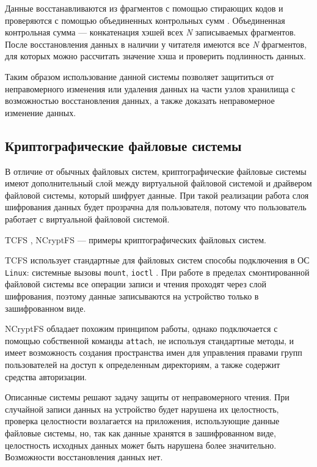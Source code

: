 Данные восстанавливаются из фрагментов с помощью стирающих кодов\cite{erasurecode} и проверяются с помощью объединенных контрольных сумм \cite{pasis}. Объединенная контрольная сумма --- конкатенация хэшей всех \textit{N} записываемых фрагментов. После восстановления данных в наличии у читателя имеются все \textit{N} фрагментов, для которых можно рассчитать значение хэша и проверить подлинность данных.

Таким образом использование данной системы позволяет защититься от неправомерного изменения или удаления данных на части узлов хранилища с возможностью восстановления данных, а также доказать неправомерное изменение данных.

\subsection{Криптографические файловые системы}

В отличие от обычных файловых систем, криптографические файловые системы имеют дополнительный слой между виртуальной файловой системой и драйвером файловой системы, который шифрует данные. При такой реализации работа слоя шифрования данных будет прозрачна для пользователя, потому что пользователь работает с виртуальной файловой системой.

TCFS \cite{tcfs}, NCryptFS \cite{ncryptfs} --- примеры криптографических файловых систем.

TCFS использует стандартные для файловых систем способы подключения в ОС \texttt{Linux}: системные вызовы \texttt{mount}, \texttt{ioctl} \cite{linux}. При работе в пределах смонтированной файловой системы все операции записи и чтения проходят через слой шифрования, поэтому данные записываются на устройство только в зашифрованном виде.

NCryptFS обладает похожим принципом работы, однако подключается с помощью собственной команды \texttt{attach}, не используя стандартные методы, и имеет возможность создания пространства имен для управления правами групп пользователей на доступ к определенным директориям, а также содержит средства авторизации.

Описанные системы решают задачу защиты от неправомерного чтения. При случайной записи данных на устройство будет нарушена их целостность, проверка целостности возлагается на приложения, использующие данные файловые системы, но, так как данные хранятся в зашифрованном виде, целостность исходных данных может быть нарушена более значительно. Возможности восстановления данных нет.

